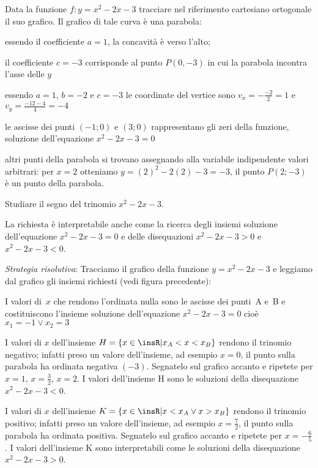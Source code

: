 \begin{esempio}
Data la funzione $f: y=x^2-2x-3$ tracciare nel riferimento cartesiano 
ortogonale 
il suo grafico.
Il grafico di tale curva è una parabola:
\begin{itemize*}
\item essendo il coefficiente $a=1$, la concavità è verso l'alto;
\item il coefficiente $c=-3$ corrisponde al punto $P(0,-3)$ in cui la parabola 
incontra l'asse delle $y$
\item essendo $ a=1 $, $b=-2$ e $c=-3$ le coordinate del vertice sono 
$v_x=-\frac{-2} 2=1$ e $v_y=\frac{-12-4} 4=-4$
\item le ascisse dei punti $(-1;0)$ e $(3;0)$ rappresentano gli zeri della 
funzione, soluzione dell'equazione $x^2-2x-3=0$
\item altri punti della parabola si trovano assegnando alla variabile 
indipendente valori arbitrari: per $x=2$ otteniamo $y=(2)^2-2(2)-3=-3$, il 
punto 
$P(2;-3)$ è un punto della parabola.
\end{itemize*}

\begin{center}
 
\end{center}
\end{esempio}
\begin{esempio}
Studiare il segno del trinomio $x^2-2x-3$.

La richiesta è interpretabile anche come la ricerca degli insiemi soluzione 
dell'equazione $x^2-2x-3=0$ e delle disequazioni $x^2-2x-3>0$ e $x^2-2x-3<0$.

\emph{Strategia risolutiva}:
Tracciamo il grafico della funzione $y=x^2-2x-3$ e leggiamo dal grafico gli 
insiemi richiesti (vedi figura precedente):
\begin{itemize*}
\item I valori di~$x$ che rendono l'ordinata nulla sono le ascisse dei punti~A 
e~B e costituiscono l'insieme soluzione dell'equazione $x^2-2x-3=0$ cioè 
$x_1=-1\vee x_2=3$
\item I valori di $x$ dell'insieme $H=\{x\in \insR | x_A<x<x_B\}$ rendono il 
trinomio negativo; infatti preso un valore dell'insieme, ad esempio $x=0$, il 
punto sulla parabola ha ordinata negativa $(-3)$. Segnatelo sul grafico accanto 
e ripetete per $x=1$, $x=\frac 3 2$, $x=2$.
I valori dell'insieme H sono le soluzioni della disequazione $x^2-2x-3<0$.
\item I valori di $x$ dell'insieme $K=\{x\in \insR | x<x_A\vee x>x_B\}$ rendono 
il trinomio positivo; infatti preso un valore dell'insieme, ad esempio $x=\frac 
7 2$, il punto sulla parabola ha ordinata positiva. Segnatelo sul grafico 
accanto e ripetete per $x=-\frac{6}{5}$.
I valori dell'insieme K sono interpretabili come le soluzioni della 
disequazione 
$x^2-2x-3>0$.
\end{itemize*}
\end{esempio}

